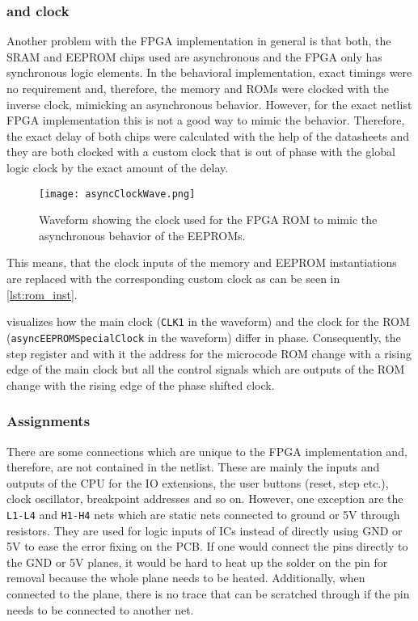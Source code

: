 \subsubsection{ and  clock}
Another problem with the \gls{FPGA} implementation in general is that both, the \gls{SRAM} and \gls{EEPROM} chips used are asynchronous and the \gls{FPGA} only has synchronous logic elements.
In the behavioral implementation, exact timings were no requirement and, therefore, the memory and \glspl{ROM} were clocked with the inverse clock, mimicking an asynchronous behavior.
However, for the exact netlist \gls{FPGA} implementation this is not a good way to mimic the behavior.
Therefore, the exact delay of both chips were calculated with the help of the datasheets and they are both clocked with a custom clock that is out of phase with the global logic clock by the exact amount of the delay.
\begin{figure}
  \centering
  \texttt{[image: asyncClockWave.png]}
  \caption{Waveform showing the clock used for the \gls{FPGA} \gls{ROM} to mimic the asynchronous behavior of the \glspl{EEPROM}.}
  \label{fig:asyncClockWave}
\end{figure}

This means, that the clock inputs of the memory and \gls{EEPROM} instantiations are replaced with the corresponding custom clock as can be seen in \cref{lst:rom_inst}.

 visualizes how the main clock (\texttt{CLK1} in the waveform) and the clock for the \gls{ROM} (\texttt{asyncEEPROMSpecialClock} in the waveform) differ in phase.
Consequently, the step register and with it the address for the microcode \gls{ROM} change with a rising edge of the main clock but all the control signals which are outputs of the \gls{ROM} change with the rising edge of the phase shifted clock.

\subsubsection{Assignments}
There are some connections which are unique to the \gls{FPGA} implementation and, therefore, are not contained in the netlist.
These are mainly the inputs and outputs of the \gls{CPU} for the \gls{IO} extensions, the user buttons (reset, step etc.), clock oscillator, breakpoint addresses and so on.
However, one exception are the \texttt{L1-L4} and \texttt{H1-H4} nets which are static nets connected to ground or 5V through resistors.
They are used for logic inputs of \glspl{IC} instead of directly using GND or 5V to ease the error fixing on the \gls{PCB}.
If one would connect the pins directly to the GND or 5V planes, it would be hard to heat up the solder on the pin for removal because the whole plane needs to be heated.
Additionally, when connected to the plane, there is no trace that can be scratched through if the pin needs to be connected to another net.

